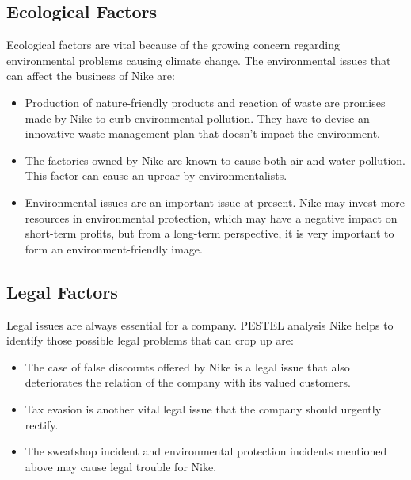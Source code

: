\documentclass[a4paper, 12pt]{report}
\begin{document}
\subsection{Ecological Factors}
Ecological factors are vital because of the growing concern regarding environmental problems causing climate change. The environmental issues that can affect the business of Nike are:
\begin{itemize}
    \item Production of nature-friendly products and reaction of waste are promises made by Nike to curb environmental pollution. They have to devise an innovative waste management plan that doesn’t impact the environment.
    \item The factories owned by Nike are known to cause both air and water pollution. This factor can cause an uproar by environmentalists.
    \item Environmental issues are an important issue at present. Nike may invest more resources in environmental protection, which may have a negative impact on short-term profits, but from a long-term perspective, it is very important to form an environment-friendly image.
\end{itemize}
\subsection{Legal Factors}
Legal issues are always essential for a company. PESTEL analysis Nike helps to identify those possible legal problems that can crop up are:
\begin{itemize}
    \item The case of false discounts offered by Nike is a legal issue that also deteriorates the relation of the company with its valued customers.
    \item Tax evasion is another vital legal issue that the company should urgently rectify.
    \item The sweatshop incident and environmental protection incidents mentioned above may cause legal trouble for Nike. 
\end{itemize}
\end{document}
